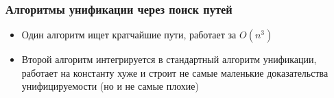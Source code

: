 \documentclass{beamer}
\begin{document}
\begin{frame}[fragile]
  \frametitle{Алгоритмы унификации через поиск путей}
\begin{itemize}
  \item Один алгоритм ищет кратчайшие пути, работает за $O(n^3)$
  \item Второй алгоритм интегрируется в стандартный алгоритм унификации, работает  на константу хуже и строит не самые маленькие доказательства унифицируемости (но и не самые плохие)
\end{itemize}
\end{frame}
\end{document}
